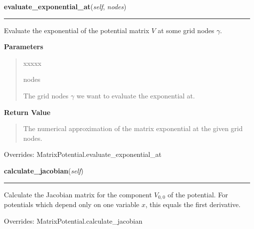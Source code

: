 \hspace{.8\funcindent}\begin{boxedminipage}{\funcwidth}

    \raggedright \textbf{evaluate\_exponential\_at}(\textit{self}, \textit{nodes})

    \vspace{-1.5ex}

    \rule{\textwidth}{0.5\fboxrule}
\setlength{\parskip}{2ex}
    Evaluate the exponential of the potential matrix $V$ at some grid
    nodes $\gamma$.

\setlength{\parskip}{1ex}
      \textbf{Parameters}
      \vspace{-1ex}

      \begin{quote}
        \begin{Ventry}{xxxxx}

          \item[nodes]

          The grid nodes $\gamma$ we want to evaluate the
          exponential at.

        \end{Ventry}

      \end{quote}

      \textbf{Return Value}
    \vspace{-1ex}

      \begin{quote}
      The numerical approximation of the matrix exponential at the given
      grid nodes.

      \end{quote}

      Overrides: MatrixPotential.evaluate\_exponential\_at

    \end{boxedminipage}

    \vspace{0.5ex}

\hspace{.8\funcindent}\begin{boxedminipage}{\funcwidth}

    \raggedright \textbf{calculate\_jacobian}(\textit{self})

    \vspace{-1.5ex}

    \rule{\textwidth}{0.5\fboxrule}
\setlength{\parskip}{2ex}
    Calculate the Jacobian matrix for the component $V_{0,0}$ of the
    potential. For potentials which depend only on one variable $x$, this
    equals the first derivative.

\setlength{\parskip}{1ex}

      Overrides: MatrixPotential.calculate\_jacobian

    \end{boxedminipage}

